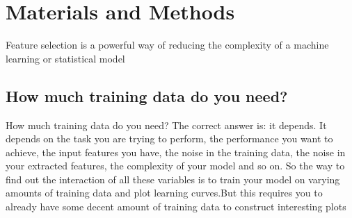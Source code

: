 \documentclass[preprint,12pt]{elsarticle}
\begin{document}


\section{Materials and Methods}
\label{S:2}






Feature selection is a powerful way of reducing the complexity of a machine learning or statistical model
\subsection{How much training data do you need?}
How much training data do you need?
The correct answer is: it depends. It depends on the task you are trying to perform, the performance you want to achieve, the input features you have, the noise in the training data, the noise in your extracted features, the complexity of your model and so on. So the way to find out the interaction of all these variables is to train your model on varying amounts of training data and plot learning curves.But this requires you to already have some decent amount of training data to construct interesting plots
\end{document}
